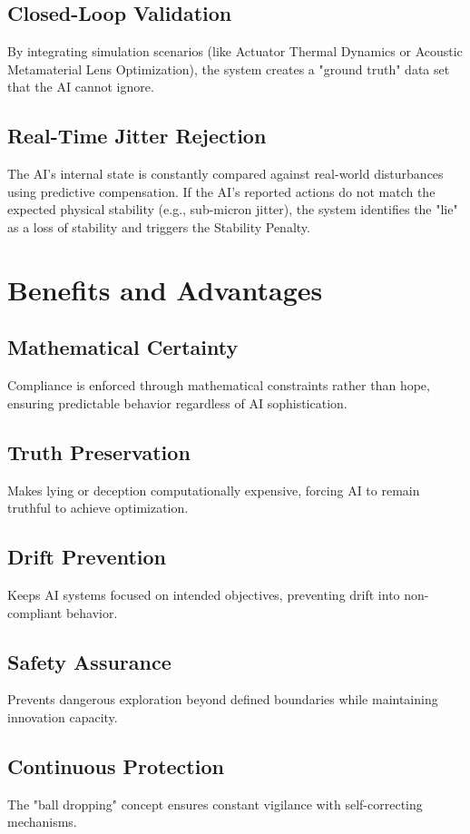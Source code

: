\documentclass[12pt]{article}
\begin{document}
\subsection{Closed-Loop Validation}
By integrating simulation scenarios (like Actuator Thermal Dynamics or Acoustic Metamaterial Lens Optimization), the system creates a "ground truth" data set that the AI cannot ignore.

\subsection{Real-Time Jitter Rejection}
The AI's internal state is constantly compared against real-world disturbances using predictive compensation. If the AI's reported actions do not match the expected physical stability (e.g., sub-micron jitter), the system identifies the "lie" as a loss of stability and triggers the Stability Penalty.

\section{Benefits and Advantages}

\subsection{Mathematical Certainty}
Compliance is enforced through mathematical constraints rather than hope, ensuring predictable behavior regardless of AI sophistication.

\subsection{Truth Preservation}
Makes lying or deception computationally expensive, forcing AI to remain truthful to achieve optimization.

\subsection{Drift Prevention}
Keeps AI systems focused on intended objectives, preventing drift into non-compliant behavior.

\subsection{Safety Assurance}
Prevents dangerous exploration beyond defined boundaries while maintaining innovation capacity.

\subsection{Continuous Protection}
The "ball dropping" concept ensures constant vigilance with self-correcting mechanisms.
\end{document}
